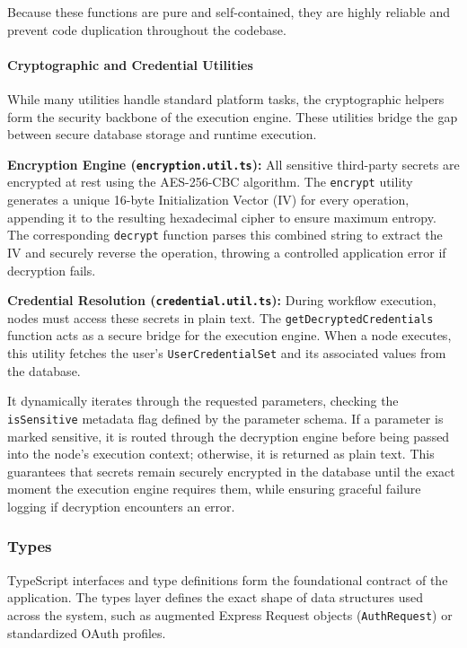 Because these functions are pure and self-contained, they are highly reliable and prevent code duplication throughout the codebase.

\paragraph{Cryptographic and Credential Utilities}
While many utilities handle standard platform tasks, the cryptographic helpers form the security backbone of the execution engine. These utilities bridge the gap between secure database storage and runtime execution.

\textbf{Encryption Engine (\texttt{encryption.util.ts}):}
All sensitive third-party secrets are encrypted at rest using the AES-256-CBC algorithm. The \texttt{encrypt} utility generates a unique 16-byte Initialization Vector (IV) for every operation, appending it to the resulting hexadecimal cipher to ensure maximum entropy. The corresponding \texttt{decrypt} function parses this combined string to extract the IV and securely reverse the operation, throwing a controlled application error if decryption fails.

\textbf{Credential Resolution (\texttt{credential.util.ts}):}
During workflow execution, nodes must access these secrets in plain text. The \texttt{getDecryptedCredentials} function acts as a secure bridge for the execution engine. When a node executes, this utility fetches the user's \texttt{UserCredentialSet} and its associated values from the database. 

It dynamically iterates through the requested parameters, checking the \texttt{isSensitive} metadata flag defined by the parameter schema. If a parameter is marked sensitive, it is routed through the decryption engine before being passed into the node's execution context; otherwise, it is returned as plain text. This guarantees that secrets remain securely encrypted in the database until the exact moment the execution engine requires them, while ensuring graceful failure logging if decryption encounters an error.

\subsubsection{Types}
TypeScript interfaces and type definitions form the foundational contract of the application. The types layer defines the exact shape of data structures used across the system, such as augmented Express Request objects (\texttt{AuthRequest}) or standardized OAuth profiles. 

